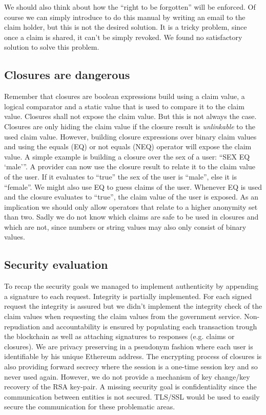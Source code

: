We should also think about how the “right to be forgotten” will be enforced. Of course we can simply introduce to do this manual by writing an email to the claim holder, but this is not the desired solution. It is a tricky problem, since once a claim is shared, it can’t be simply revoked. We found no satisfactory solution to solve this problem.

\subsection{Closures are dangerous}
Remember that closures are boolean expressions build using a claim value, a logical comparator and a static value that is used to compare it to the claim value. Closures shall not expose the claim value. But this is not always the case. Closures are only hiding the claim value if the closure result is \textit{unlinkable} to the used claim value. However, building closure expressions over binary claim values and using the equals (EQ) or not equals (NEQ) operator will expose the claim value. A simple example is building a closure over the sex of a user: “SEX EQ ‘male’”. A provider can now use the closure result to relate it to the claim value of the user. If it evaluates to “true” the sex of the user is “male”, else it is “female”. We might also use EQ to guess claims of the user. Whenever EQ is used and the closure evaluates to “true”, the claim value of the user is exposed. As an implication we should only allow operators that relate to a higher anonymity set than two. Sadly we do not know which claims are safe to be used in closures and which are not, since numbers or string values may also only consist of binary values. 

\subsection{Security evaluation}
\label{sec:securityEvaluation}
To recap the security goals we managed to implement authenticity by appending a signature to each request. Integrity is partially implemented. For each signed request the integrity is assured but we didn’t implement the integrity check of the claim values when requesting the claim values from the government service. Non-repudiation and accountability is ensured by populating each transaction trough the blockchain as well as attaching signatures to responses (e.g. claims or closures). We are privacy preserving in a pseudonym fashion where each user is identifiable by his unique Ethereum address. The encrypting process of closures is also providing forward secrecy where the session is a one-time session key and so never used again. However, we do not provide a mechanism of key change/key recovery of the RSA key-pair. A missing security goal is confidentiality since the communication between entities is not secured. TLS/SSL would be used to easily secure the communication for these problematic areas.

